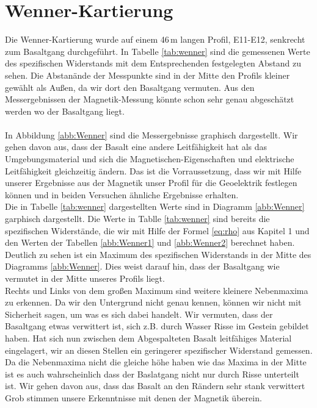 

\section{Wenner-Kartierung}
Die Wenner-Kartierung wurde auf einem 46\,m langen Profil, E11-E12, senkrecht zum Basaltgang durchgeführt. In Tabelle \ref{tab:wenner} sind die gemessenen Werte des spezifischen Widerstands mit dem Entsprechenden festgelegten Abstand zu sehen. Die Abstanände
der Messpunkte sind in der Mitte den Profils kleiner gewählt als Außen, da wir dort den Basaltgang vermuten. Aus den Messergebnissen der Magnetik-Messung könnte schon sehr genau abgeschätzt werden wo der Basaltgang liegt.\\
\\
In Abbildung \ref{abb:Wenner} sind die Messergebnisse graphisch dargestellt. Wir gehen davon aus, dass der Basalt eine andere Leitfähigkeit hat als das Umgebungsmaterial und sich die Magnetischen-Eigenschaften und elektrische Leitfähigkeit 
gleichzeitig ändern. Das ist die Vorraussetzung, dass wir mit Hilfe unserer Ergebnisse aus der Magnetik unser Profil für die Geoelektrik festlegen können und in beiden Versuchen ähnliche Ergebnisse erhalten.\\
Die in Tabelle \ref{tab:wenner} dargestellten Werte sind in Diagramm \ref{abb:Wenner} garphisch dargestellt. Die Werte in Tablle \ref{tab:wenner} sind bereits die spezifischen Widerstände, die wir mit Hilfe der Formel \ref{eq:rho} aus Kapitel 1 und den Werten der Tabellen \ref{abb:Wenner1} und \ref{abb:Wenner2} berechnet haben.
Deutlich zu sehen ist ein Maximum des spezifischen Widerstands in der Mitte des Diagramms \ref{abb:Wenner}.
Dies weist darauf hin, dass der Basaltgang wie vermutet in der Mitte unseres Profils liegt. \\
Rechts und Links von dem großen Maximum sind weitere kleinere Nebenmaxima zu erkennen. Da wir den Untergrund nicht genau kennen, können wir nicht mit Sicherheit sagen, um was es sich dabei handelt. Wir vermuten, dass der Basaltgang etwas verwittert 
ist, sich z.B. durch Wasser Risse im Gestein gebildet haben. Hat sich nun zwischen dem Abgespalteten Basalt leitfähiges Material eingelagert, wir an diesen Stellen ein geringerer spezifischer Widerstand gemessen.\\
Da die Nebenmaxima nicht die gleiche höhe haben wie das Maxima in der Mitte ist es auch wahrscheinlich dass der Baslatgang nicht nur durch Risse unterteilt ist. Wir gehen davon aus, dass das Basalt an den Rändern sehr stank verwittert
\\
Grob stimmen unsere Erkenntnisse mit denen der Magnetik überein.




